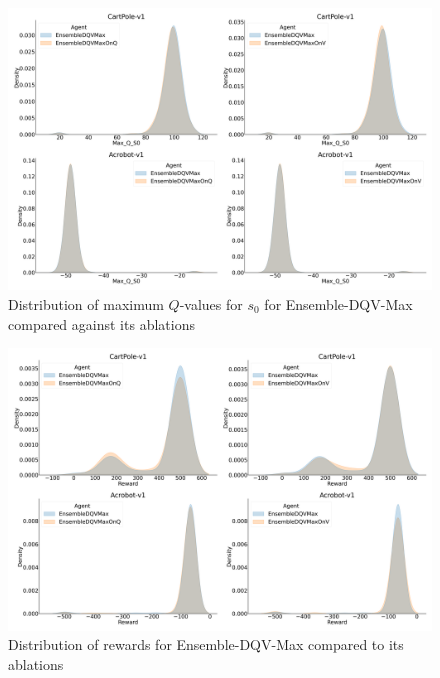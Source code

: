 \begin{figure}[H]
  \centering
  \includegraphics[width=.5\textwidth]{img/dqvmax_abl_qv_dist.png}
  \caption{Distribution of maximum $Q$-values for $s_0$ for
    Ensemble-DQV-Max compared against its
    ablations}\label{fig:dqvmax_abl_qv_dist}
\end{figure}

\begin{figure}[H]
  \centering
  \includegraphics[width=.5\textwidth]{img/dqvmax_abl_rwd_dist.png}
  \caption{Distribution of rewards for Ensemble-DQV-Max compared to
    its ablations}\label{fig:dqvmax_abl_rwd_dist}
\end{figure}
